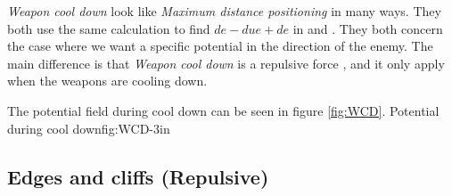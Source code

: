 {	\textit{Weapon cool down} look like \textit{Maximum distance positioning} in many ways. They both use the same calculation to find $de - due + de$ in  and .
	They both concern the case where we want a specific potential in the direction of the enemy. The main difference is that \textit{Weapon cool down} is a repulsive force , and it only apply when the weapons are cooling down.
	
	The potential field during cool down can be seen in figure \ref{fig:WCD}.
			{Potential during cool down}{fig:WCD}{-3in}
	\subsection{Edges and cliffs (Repulsive)}}